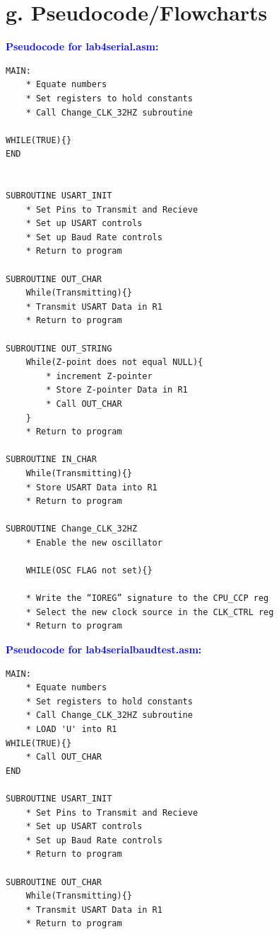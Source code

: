 \documentclass[11pt]{article}
\theoremstyle{plain}
\theoremstyle{definition}
\begin{document}
\section*{g. Pseudocode/Flowcharts}
%
%
\textbf{\textcolor{blue}{Pseudocode for lab4\textunderscore serial.asm:}}
\begin{tcolorbox}
\begin{verbatim}
MAIN:
    * Equate numbers
    * Set registers to hold constants
    * Call Change_CLK_32HZ subroutine
    
WHILE(TRUE){}
END


SUBROUTINE USART_INIT
    * Set Pins to Transmit and Recieve
    * Set up USART controls 
    * Set up Baud Rate controls
    * Return to program

SUBROUTINE OUT_CHAR
    While(Transmitting){}
    * Transmit USART Data in R1
    * Return to program    	
	
SUBROUTINE OUT_STRING
    While(Z-point does not equal NULL){
        * increment Z-pointer
        * Store Z-pointer Data in R1 
    	* Call OUT_CHAR
    }
    * Return to program      

SUBROUTINE IN_CHAR
    While(Transmitting){}
    * Store USART Data into R1
    * Return to program 

SUBROUTINE Change_CLK_32HZ
    * Enable the new oscillator

    WHILE(OSC FLAG not set){}

    * Write the “IOREG” signature to the CPU_CCP reg
    * Select the new clock source in the CLK_CTRL reg
    * Return to program
\end{verbatim}
\end{tcolorbox}
%
%
\newpage
\textbf{\textcolor{blue}{Pseudocode for lab4\textunderscore serial\textunderscore baud\textunderscore test.asm:}}
\begin{tcolorbox}
\begin{verbatim}
MAIN:
    * Equate numbers
    * Set registers to hold constants
    * Call Change_CLK_32HZ subroutine
    * LOAD 'U' into R1
WHILE(TRUE){}
    * Call OUT_CHAR
END

SUBROUTINE USART_INIT
    * Set Pins to Transmit and Recieve
    * Set up USART controls 
    * Set up Baud Rate controls
    * Return to program

SUBROUTINE OUT_CHAR
    While(Transmitting){}
    * Transmit USART Data in R1
    * Return to program
\end{verbatim}
\end{tcolorbox}	
\end{document}

